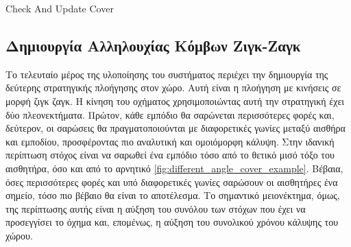 \begin{algorithm}[H]
\caption{Check And Update Cover}
\label{alg:check_and_update_cover}
\end{algorithm}

\subsection{Δημιουργία Αλληλουχίας Κόμβων Ζιγκ-Ζαγκ}
\label{subsection:zig_zag_sequence_implementation}

Το τελευταίο μέρος της υλοποίησης του συστήματος περιέχει την δημιουργία της δεύτερης στρατηγικής πλοήγησης στον χώρο. Αυτή είναι η πλοήγηση με κινήσεις σε μορφή ζιγκ ζαγκ. Η κίνηση του οχήματος χρησιμοποιώντας αυτή την στρατηγική έχει δύο πλεονεκτήματα. Πρώτον, κάθε εμπόδιο θα σαρώνεται περισσότερες φορές και, δεύτερον, οι σαρώσεις θα πραγματοποιούνται με διαφορετικές γωνίες μεταξύ αισθήρα και εμποδίου, προσφέροντας πιο αναλυτική και ομοιόμορφη κάλυψη. Στην ιδανική περίπτωση στόχος είναι να σαρωθεί ένα εμπόδιο τόσο από το θετικό μισό τόξο του αισθητήρα, όσο και από το αρνητικό \ref{fig:different_angle_cover_example}. Βέβαια, όσες περισσότερες φορές και υπό διαφορετικές γωνίες σαρώσουν οι αισθητήρες ένα σημείο, τόσο πιο βέβαιο θα είναι το αποτέλεσμα. Το σημαντικό μειονέκτημα, όμως, της περίπτωσης αυτής είναι η αύξηση του συνόλου των στόχων που έχει να προσεγγίσει το όχημα και, επομένως, η αύξηση του συνολικού χρόνου κάλυψης του χώρου.

